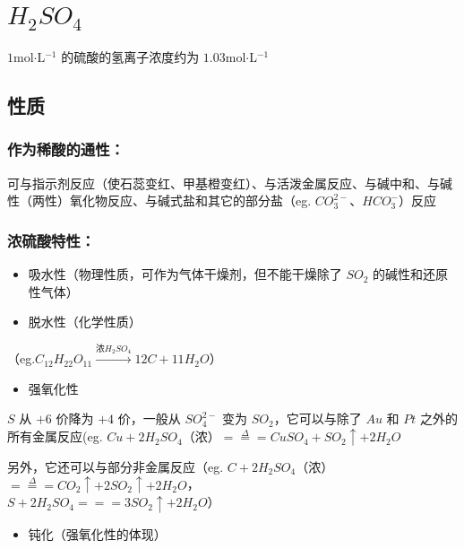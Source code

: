 \documentclass[UTF8,zihao=-4,openany]{ctexbook}
\begin{document}
\section{$H_2SO_4$}
$1$mol$\cdot$L$^{-1}$ 的硫酸的氢离子浓度约为 $1.03$mol$\cdot$L$^{-1}$\par
\subsection{性质}
\subsubsection{作为稀酸的通性：}
可与指示剂反应（使石蕊变红、甲基橙变红）、与活泼金属反应、与碱中和、与碱性（两性）氧化物反应、与碱式盐和其它的部分盐（eg. $CO_3^{2-}$、$HCO_3^-$）反应\par

\subsubsection{浓硫酸特性：}
\begin{itemize}
\item 吸水性（物理性质，可作为气体干燥剂，但不能干燥除了 $SO_2$ 的碱性和还原性气体）
\end{itemize}

\begin{itemize}
\item 脱水性（化学性质）
\end{itemize}

（eg.$C_{12}H_{22}O_{11}\stackrel{\mbox{浓} H_2SO_4}{\longrightarrow}12C+11H_2O$）\par

\begin{itemize}
\item 强氧化性
\end{itemize}

$S$ 从 $+6$ 价降为 $+4$ 价，一般从 $SO_4^{2-}$ 变为 $SO_2$，它可以与除了 $Au$ 和 $Pt$ 之外的所有金属反应(eg. $Cu+2H_2SO_4$（浓）$\stackrel{\Delta}{=\!=\!=}CuSO_4+SO_2\uparrow+2H_2O$\par

另外，它还可以与部分非金属反应（eg. $C+2H_2SO_4$（浓）$\stackrel{\Delta}{=\!=\!=}CO_2\uparrow+2SO_2\uparrow+2H_2O$，\\[0.25em]
\hspace*{2em}$S+2H_2SO_4=\!=\!=3SO_2\uparrow+2H_2O$）\par

\begin{itemize}
\item 钝化（强氧化性的体现）
\end{itemize}
\end{document}
